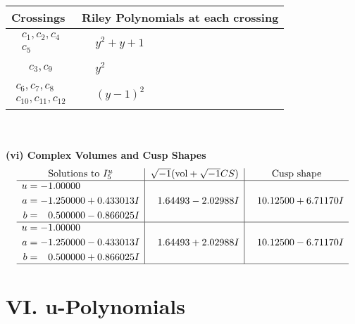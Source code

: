 \documentclass[1p]{elsarticle_modified}
\theoremstyle{definition}
\newcommand{\I}{\sqrt{-1}}
\begin{document}
\begin{tabular}{m{50pt}|m{274pt}}
Crossings & \hspace{64pt}Riley Polynomials at each crossing \\
\hline $$\begin{aligned}c_{1},c_{2},c_{4}\\c_{5}\end{aligned}$$&$\begin{aligned}
&y^2+y+1
\end{aligned}$\\
\hline $$\begin{aligned}c_{3},c_{9}\end{aligned}$$&$\begin{aligned}
&y^2
\end{aligned}$\\
\hline $$\begin{aligned}c_{6},c_{7},c_{8}\\c_{10},c_{11},c_{12}\end{aligned}$$&$\begin{aligned}
&(y-1)^2
\end{aligned}$\\
\hline
\end{tabular}\\~\\
\newpage\flushleft \textbf{(vi) Complex Volumes and Cusp Shapes}
$$\begin{array}{c|c|c}  
\text{Solutions to }I^u_{5}& \I (\text{vol} + \sqrt{-1}CS) & \text{Cusp shape}\\
 \hline 
\begin{aligned}
u &= -1.00000\phantom{ +0.000000I} \\
a &= -1.250000 + 0.433013 I \\
b &= \phantom{-}0.500000 - 0.866025 I\end{aligned}
 & \phantom{-}1.64493 - 2.02988 I & \phantom{-}10.12500 + 6.71170 I \\ \hline\begin{aligned}
u &= -1.00000\phantom{ +0.000000I} \\
a &= -1.250000 - 0.433013 I \\
b &= \phantom{-}0.500000 + 0.866025 I\end{aligned}
 & \phantom{-}1.64493 + 2.02988 I & \phantom{-}10.12500 - 6.71170 I\\
 \hline 
 \end{array}$$\newpage
\newpage\renewcommand{\arraystretch}{1}
\centering \section*{ VI. u-Polynomials}
\end{document}
